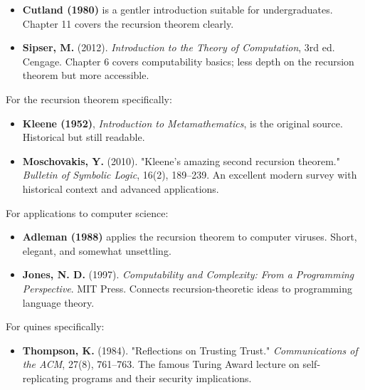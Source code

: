 \begin{itemize}
\item \textbf{Cutland (1980)} is a gentler introduction suitable for undergraduates. Chapter 11 covers the recursion theorem clearly.
\end{itemize}

\begin{itemize}
\item \textbf{Sipser, M.} (2012). \textit{Introduction to the Theory of Computation}, 3rd ed. Cengage. Chapter 6 covers computability basics; less depth on the recursion theorem but more accessible.
\end{itemize}

For the recursion theorem specifically:

\begin{itemize}
\item \textbf{Kleene (1952)}, \textit{Introduction to Metamathematics}, is the original source. Historical but still readable.
\end{itemize}

\begin{itemize}
\item \textbf{Moschovakis, Y.} (2010). "Kleene's amazing second recursion theorem." \textit{Bulletin of Symbolic Logic}, 16(2), 189--239. An excellent modern survey with historical context and advanced applications.
\end{itemize}

For applications to computer science:

\begin{itemize}
\item \textbf{Adleman (1988)} applies the recursion theorem to computer viruses. Short, elegant, and somewhat unsettling.
\end{itemize}

\begin{itemize}
\item \textbf{Jones, N. D.} (1997). \textit{Computability and Complexity: From a Programming Perspective}. MIT Press. Connects recursion-theoretic ideas to programming language theory.
\end{itemize}

For quines specifically:

\begin{itemize}
\item \textbf{Thompson, K.} (1984). "Reflections on Trusting Trust." \textit{Communications of the ACM}, 27(8), 761--763. The famous Turing Award lecture on self-replicating programs and their security implications.
\end{itemize}
